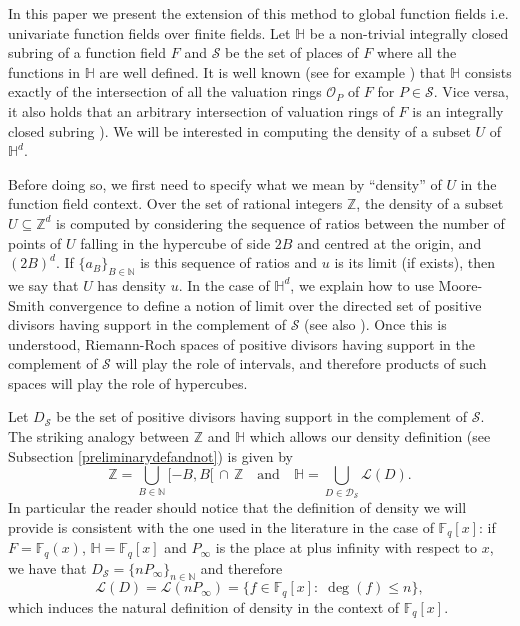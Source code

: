 \documentclass[10pt]{amsart}
\newcommand{\vF}{\mathbb{F}}
\newcommand{\vN}{\mathbb{N}}
\newcommand{\vZ}{\mathbb{Z}}
\newcommand{\vH}{\mathbb{H}}
\newcommand{\cO}{\mathcal{O}}
\newcommand{\cS}{\mathcal{S}}
\newcommand{\cL}{\mathcal{L}}
\theoremstyle{definition}
\theoremstyle{remark}
\numberwithin{equation}{section}
\begin{document}
In this paper we present the extension of this method to global function fields i.e. univariate function fields over finite fields. Let $\vH$ be a non-trivial integrally closed subring of a function field $F$ and $\cS$ be the set of places of $F$ where all the functions in $\vH$ are well defined. It is well known (see for example \cite[Theorem 3.2.6]{bib:stichtenoth2009algebraic}) that $\vH$ consists exactly of the intersection of all the valuation rings $\cO_P$ of $F$ for $P\in\cS$. Vice versa, it also holds that an arbitrary intersection of valuation rings of $F$ is an integrally closed subring \cite[Proposition 3.2.5]{bib:stichtenoth2009algebraic}).
We will be interested in computing the density of a subset $U$ of $\vH^d$.

Before doing so, we first need to specify what  we mean by ``density'' of $U$ in the function field context. Over the set of rational integers $\vZ$, the density of a subset $U\subseteq \vZ^d$ is computed by considering the sequence of ratios between the number of points of $U$ falling in the hypercube of side $2B$ and centred at the origin, and $(2B)^d$. If $\{a_B\}_{B\in \vN}$ is this sequence of ratios and $u$ is its limit (if exists), then we say that $U$ has density $u$.
In the case of $\vH^d$, we explain how to use Moore-Smith convergence 
\cite[Chapter 2]{bib:kelley1955general} to define a notion of limit over the directed set of positive divisors having support in the complement of  $\cS$ (see also \citep{bib:BS}). Once this is understood, Riemann-Roch spaces of positive divisors having support in the complement of $\cS$ will play the role of intervals, and therefore products of such spaces will play the role of hypercubes.
 
Let $D_\cS$ be the set of positive divisors having support in the complement of $\cS$. The striking analogy between $\vZ$ and $\vH$ which allows our density definition (see Subsection \ref{preliminarydefandnot}) is  given by
\[\vZ=\bigcup_{B\in \vN}[-B,B[\,\cap\, \vZ \quad \text{and} \quad \vH=\bigcup_{D\in \mathcal D_\cS} \cL(D).\] 
In particular the reader should notice that the definition of density we will provide is consistent with the one used in the literature in the case of $\vF_q[x]$: if $F=\vF_q(x)$, $\vH=\vF_q[x]$ and $P_\infty$ is the place at plus infinity with respect to $x$, we have that $D_\cS=\{n P_\infty\}_{n\in \vN}$ and therefore 
 \[\cL(D)=\cL(nP_\infty)=\{f\in \vF_q[x]: \; \deg(f)\leq n\},\]
which induces the natural definition of density in the context of $\vF_q[x]$.
\end{document}
